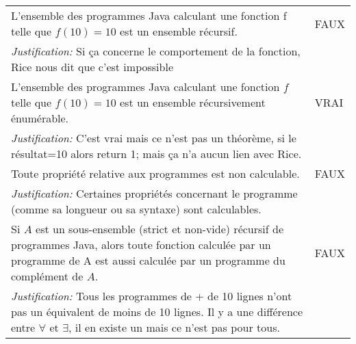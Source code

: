 \begin{longtable}{p{13cm}|l}
    L'ensemble des programmes Java calculant une fonction f telle que $f(10)=10$ est un ensemble récursif. & FAUX \\
    \textit{Justification:} Si ça concerne le comportement de la fonction, Rice nous dit que c'est impossible & \\ \hline
    L'ensemble des programmes Java calculant une fonction $f$ telle que $f(10) = 10$ est un ensemble récursivement énumérable. & VRAI \\
    \textit{Justification:} C'est vrai mais ce n'est pas un théorème, si le résultat=10 alors return 1; mais ça n'a aucun lien avec Rice. & \\ \hline
    Toute propriété relative aux programmes est non calculable. & FAUX \\
    \textit{Justification:} Certaines propriétés concernant le programme (comme sa longueur ou sa syntaxe) sont calculables. & \\ \hline
    Si $A$ est un sous-ensemble (strict et non-vide) récursif de programmes Java, alors toute fonction calculée par un programme de A est aussi calculée par un programme du complément de $A$. & FAUX \\
    \textit{Justification:} Tous les programmes de + de 10 lignes n'ont pas un équivalent de moins de 10 lignes. Il y a une différence entre $\forall$ et $\exists$, il en existe un mais ce n'est pas pour tous. & \\
\end{longtable}